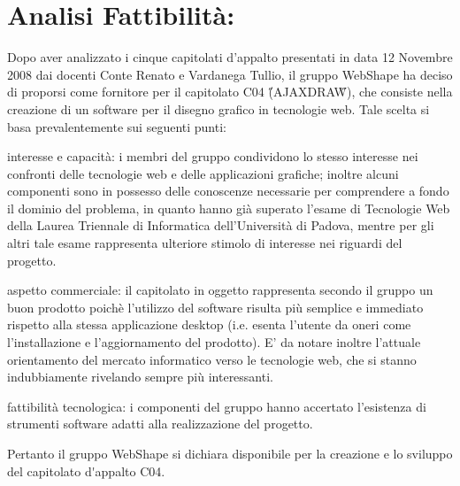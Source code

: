 \section{\Large Analisi Fattibilit\`{a}:}
\indent \indent
Dopo aver analizzato i cinque capitolati d'appalto presentati in data 12 Novembre 2008 
dai docenti Conte Renato e Vardanega Tullio, il gruppo WebShape ha deciso di proporsi come 
fornitore per il capitolato C04 (\H{}AJAXDRAW\H{}), che consiste nella creazione di un software 
per il disegno grafico in tecnologie web.
Tale scelta si basa prevalentemente sui seguenti punti:
	\begin{elencopuntato}[\normindent]
		\item interesse e capacit\`{a}: i membri del gruppo condividono lo stesso interesse nei confronti delle tecnologie web e delle applicazioni grafiche; inoltre alcuni componenti sono in possesso delle conoscenze necessarie per comprendere a fondo il dominio del problema, in quanto hanno gi\`{a} superato l'esame di Tecnologie Web della Laurea Triennale di Informatica dell'Universit\`{a} di Padova, mentre per gli altri tale esame rappresenta ulteriore stimolo di interesse nei riguardi del progetto.
		\item aspetto commerciale: il capitolato in oggetto rappresenta secondo il gruppo un buon prodotto 
		poich\`{e} l'utilizzo del software risulta pi\`{u}  semplice e immediato rispetto alla stessa applicazione desktop	(i.e. esenta l'utente da oneri come l'installazione e l'aggiornamento del prodotto).
		E' da notare inoltre l'attuale orientamento del mercato informatico verso le tecnologie web, 
		che si stanno indubbiamente rivelando sempre pi\`{u} interessanti.
		\item fattibilit\`{a} tecnologica: i componenti del gruppo hanno accertato l'esistenza di strumenti software adatti alla realizzazione del progetto.
	\end{elencopuntato}

Pertanto il gruppo WebShape si dichiara disponibile per la creazione e lo sviluppo del capitolato d\'{}appalto C04.


